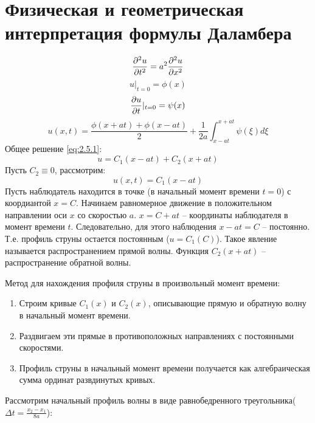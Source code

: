 \documentclass[../main.tex]{subfiles}
\begin{document}
\section{Физическая и геометрическая интерпретация формулы Даламбера}
\begin{equation}
	\label{eq:2.5.1}
	\frac{\partial ^2u}{\partial t^2}=a^2\frac{\partial ^2u}{\partial x^2}
\end{equation}
\begin{equation}
	u|_{t=0} = \phi(x)
\end{equation}
\begin{equation}
	\frac{\partial u}{\partial t}|_{t=0} = \psi(x)
\end{equation}
\begin{equation}
	u(x, t) = \frac{\phi(x + at) + \phi(x - at)}{2} + \frac{1}{2a}\int_{x-at}^{x+at}\psi(\xi)d\xi
\end{equation}
Общее решение \eqref{eq:2.5.1}:
$$
	u = C_1(x-at) + C_2(x+at)
$$
Пусть $C_2 \equiv 0$, рассмотрим:
$$
	u(x, t) = C_1(x - at)
$$
Пусть наблюдатель находится в точке (в начальный момент времени $t = 0$) с коордиантой $x = C$. Начинаем равномерное движение в положительном направлении оси $x$ со скоростью $a$.
$ x = C + at$ -- координаты наблюдателя в момент времени $t$. Следовательно, для этого наблюдения $x - at = C$ -- постоянно. Т.е. профиль струны остается постоянным ($u = C_1(C)$).
Такое явление называется распространением прямой волны. Функция $C_2(x + at)$ -- распространение обратной волны.

Метод для нахождения профиля струны в произвольный момент времени:
\begin{enumerate}
	\item Строим кривые $C_1(x)$ и $C_2(x)$, описывающие прямую и обратную волну в начальный момент времени.
	\item Раздвигаем эти прямые в противоположных направлениях с постоянными скоростями.
	\item Профиль струны в начальный момент времени получается как алгебраическая сумма ординат развдинутых кривых.
\end{enumerate}
Рассмотрим начальный профиль волны в виде равнобедренного треугольника($\Delta t = \frac{x_2-x_1}{8a}$):
\end{document}
